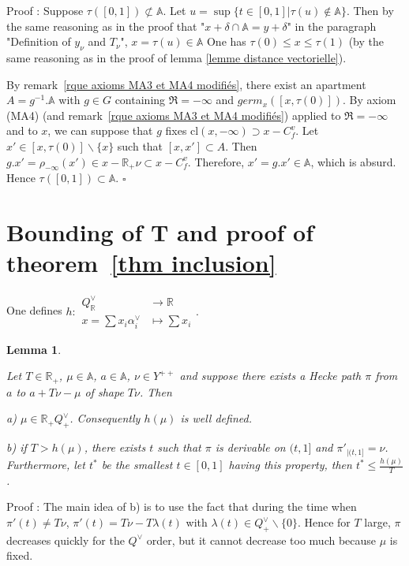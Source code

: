 \documentclass[12pt]{article}
\theoremstyle{plain}
\newtheorem{lemme}[thm]{Lemma}
\theoremstyle{definition}
\newcommand{\R}{\mathbb{R}}
\newcommand{\A}{\mathbb{A}}
\begin{document}
Proof : Suppose $\tau([0,1])\not\subset \A$. Let $u=\sup\{t\in [0,1]|\tau(u)\notin \A\}$. Then by the same reasoning as in the proof that "$x+\delta\cap\A=y+\delta$" in the paragraph "Definition of $y_\nu$ and $T_\nu$", $x=\tau(u)\in\A$ One has $\tau(0)\leq x\leq \tau(1)$ (by the same reasoning as in the proof of lemma \ref{lemme distance vectorielle}). 

By remark~\ref{rque axioms MA3 et MA4 modifiés}, there exist an apartment $A=g^{-1}.\A$ with $g\in G$ containing $\mathfrak{R}=-\infty$ and $germ_x([x,\tau(0)])$. By axiom (MA4) (and remark~\ref{rque axioms MA3 et MA4 modifiés}) applied to $\mathfrak{R}=-\infty$ and to $x$, we can suppose that $g$ fixes $\mathrm{cl}(x,-\infty)\supset x-C_f^v$.  
Let $x'\in [x,\tau(0)]\backslash\{x\}$ such that $[x,x']\subset A$. Then $g.x'=\rho_{-\infty}(x')\in x-\R_+\nu\subset x-C_f^v$. Therefore, $x'=g.x'\in \A$, which is absurd. Hence $\tau([0,1])\subset \A$. $\square$





\section{Bounding of T and proof of theorem~\ref{thm inclusion} }\label{sect bounding of T}


One defines $h:\begin{aligned} Q^\vee_{\mathbb{R}}& \rightarrow \mathbb{R}\\
x=\sum x_i\alpha_i^\vee & \mapsto \sum x_i\end{aligned}.$




\begin{lemme}\label{lemme fin des chemins de Hecke longs}


Let $T\in \mathbb{R}_+$, $\mu\in \A$,  $a\in \mathbb{A}$, $\nu\in Y^{++}$ and suppose there exists a Hecke path $\pi$ from $a$ to $a+T\nu-\mu$ of shape $T\nu$. Then 

a) $\mu\in \mathbb{R}_+ Q^\vee_+$. Consequently $h(\mu)$ is well defined.

b) if $T>h(\mu)$, there exists $t$ such that $\pi$ is derivable on $(t,1]$ and $\pi'_{|(t,1]}=\nu$. Furthermore, let $t^*$ be the smallest $t \in [0,1]$ having this property, then $t^*\leq \frac{h(\mu)}{T}$.
\end{lemme}


Proof : The main idea of b) is to use the fact that during the time when $\pi'(t)\neq T\nu$, $\pi'(t)=T\nu-T\lambda(t)$ with $\lambda(t)\in Q^\vee_+\backslash \{0\}$. Hence for $T$ large, $\pi$ decreases quickly for the $Q^\vee$ order, but it cannot decrease too much because $\mu$ is fixed.
\end{document}
